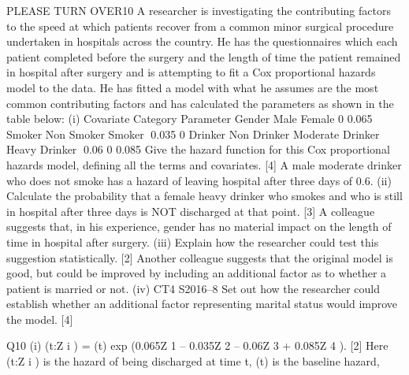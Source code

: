 PLEASE TURN OVER10
A researcher is investigating the contributing factors to the speed at which patients
recover from a common minor surgical procedure undertaken in hospitals across the
country. He has the questionnaires which each patient completed before the surgery
and the length of time the patient remained in hospital after surgery and is attempting
to fit a Cox proportional hazards model to the data.
He has fitted a model with what he assumes are the most common contributing factors
and has calculated the parameters as shown in the table below:
(i)
Covariate Category Parameter
Gender Male
Female 0
0.065
Smoker Non Smoker
Smoker 0.035
0
Drinker Non Drinker
Moderate Drinker
Heavy Drinker 0.06
0
0.085
Give the hazard function for this Cox proportional hazards model, defining all
the terms and covariates.
[4]
A male moderate drinker who does not smoke has a hazard of leaving hospital after
three days of 0.6.
(ii)
Calculate the probability that a female heavy drinker who smokes and who is
still in hospital after three days is NOT discharged at that point.
[3]
A colleague suggests that, in his experience, gender has no material impact on the
length of time in hospital after surgery.
(iii)
Explain how the researcher could test this suggestion statistically.
[2]
Another colleague suggests that the original model is good, but could be improved by
including an additional factor as to whether a patient is married or not.
(iv)
CT4 S2016–8
Set out how the researcher could establish whether an additional factor
representing marital status would improve the model.
[4]


Q10
(i)
\lambda(t:Z i ) =  (t) exp (0.065Z 1 – 0.035Z 2 – 0.06Z 3 + 0.085Z 4 ).
[2]
Here
\lambda(t:Z i ) is the hazard of being discharged at time t,
 (t) is the baseline hazard,

